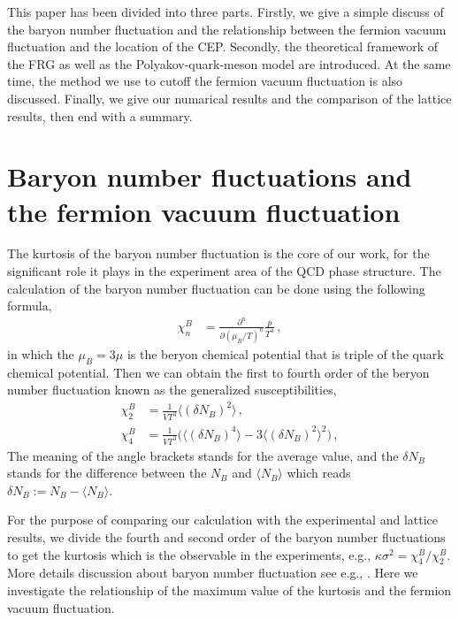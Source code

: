 \documentclass[%
reprint,
superscriptaddress,
showpacs,preprintnumbers,
 amsmath,amssymb,
 aps,
prd,
]{revtex4-1}
\begin{document}
\par
This paper has been divided into three parts. Firstly, we give a simple discuss of the baryon number fluctuation and the relationship between the fermion vacuum fluctuation and the location of the CEP. Secondly, the theoretical framework of the FRG as well as the Polyakov-quark-meson model are introduced. At the same time, the method we use to cutoff the fermion vacuum fluctuation is also discussed. Finally, we give our numarical results and the comparison of the lattice results, then end with a summary.

\section{Baryon number fluctuations and the fermion vacuum fluctuation}
\label{sec:EoS}
The kurtosis of the baryon number fluctuation is the core of our work, for the significant role it plays in the experiment area of the QCD phase structure. The calculation of the baryon number fluctuation can be done using the following formula, 
\begin{align}
   \chi_n^{B}&=\frac{\partial^n}{\partial (\mu_B/T)^n}\frac{p}{T^4}\,,\label{eq:suscept}
\end{align}
in which the $\mu_B=3\mu$ is the beryon chemical potential that is triple of the quark chemical potential. Then we can obtain the first to fourth order of the beryon number fluctuation known as the generalized susceptibilities,
\begin{align}
  \chi_2^B&=\frac{1}{VT^3}\langle(\delta N_B)^2\rangle\,,\\[2ex]
  \chi_4^B&=\frac{1}{VT^3}\Big(\langle(\delta N_B)^4\rangle-3\langle(\delta N_B)^2\rangle^2\Big)\,,
\end{align}
The meaning of the angle brackets stands for the average value, and the $\delta N_B$ stands for the difference between the $N_B$ and $\langle N_B\rangle$ which reads $\delta N_B:=N_B - \langle N_B\rangle$.\par For the purpose of comparing our calculation with the experimental and lattice results, we divide the fourth and second order of the baryon number fluctuations to get the kurtosis which is the observable in the experiments, e.g., $\kappa\sigma^2=\chi^B_4/\chi^B_2$. More details discussion about baryon number fluctuation see e.g., \cite{Fu:2015naa}. Here we investigate the relationship of the maximum value of the kurtosis and the fermion vacuum fluctuation.
\end{document}

